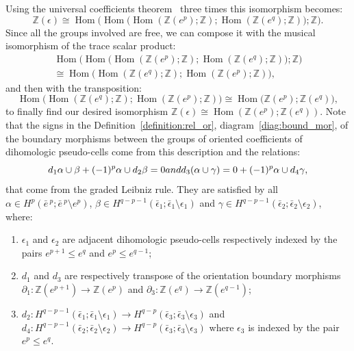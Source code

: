 \documentclass[10pt]{amsart}
\theoremstyle{definition}
\numberwithin{equation}{section}
\numberwithin{figure}{section}
\newcommand{\Z}{\mathbb{Z}}
\DeclareMathOperator{\Hom}{Hom}
\begin{document}
Using the universal coefficients theorem~\cite[Theorem~3.3 p.~113]{Car-Eil_hom_alg}
three times this isomorphism becomes:
\begin{equation*}
\Z(\epsilon) \cong \Hom\Big(\Hom\Big(\Hom(\Z(e^p);\Z);\Hom(\Z(e^q);\Z)\Big);\Z\Big).
\end{equation*}
Since all the groups involved are free, we can compose it with the musical isomorphism of the trace scalar product:
\begin{multline*}
\Hom\Big(\Hom\Big(\Hom(\Z(e^p);\Z);\Hom(\Z(e^q);\Z)\Big);\Z\Big)\\
\cong \Hom\Big(\Hom(\Z(e^q);\Z);\Hom(\Z(e^p);\Z)\Big),
\end{multline*}
and then with the transposition:
\begin{equation*}
\Hom\Big(\Hom(\Z(e^q);\Z);\Hom(\Z(e^p);\Z)\Big) \cong \Hom\Big(\Z(e^p);\Z(e^q)\Big),
\end{equation*}
to finally find our desired isomorphism $\Z(\epsilon)\cong\Hom(\Z(e^p);\Z(e^q))$. Note that the signs in the Definition~\ref{definition:rel_or}, diagram~\eqref{diag:bound_mor}, of the boundary morphisms between the groups of oriented coefficients of dihomologic pseudo-cells come from this description and the relations:
\begin{equation*}
d_1\alpha\cup\beta+(-1)^p\alpha\cup d_2\beta = 0 \textnormal{ and } d_3(\alpha\cup \gamma)=0+(-1)^p\alpha\cup d_4\gamma,
\end{equation*}
that come from the graded Leibniz rule. They are satisfied by all $\alpha\in H^p(\bar{e}\,^p;\bar{e}\,^p\setminus e^p)$, $\beta\in H^{q-p-1}(\bar{\epsilon}_1;\bar{\epsilon}_1\setminus\epsilon_1)$ and $\gamma\in H^{q-p-1}(\bar{\epsilon}_2;\bar{\epsilon}_2\setminus\epsilon_2)$, where:
\begin{enumerate}
\item $\epsilon_1$ and $\epsilon_2$ are adjacent dihomologic pseudo-cells respectively indexed by the pairs $e^{p+1}\leq e^q$ and $e^p\leq e^{q-1}$;
\item $d_1$ and $d_3$ are respectively transpose of the orientation boundary morphisms $\partial_1:\Z(e^{p+1})\rightarrow\Z(e^p)$ and ${\partial_3:\Z(e^{q})\rightarrow\Z(e^{q-1})}$;
\item $d_2:H^{q-p-1}(\bar{\epsilon}_1;\bar{\epsilon}_1\setminus\epsilon_1)\rightarrow H^{q-p}(\bar{\epsilon}_3;\bar{\epsilon}_3\setminus\epsilon_3)$ and $d_4:H^{q-p-1}(\bar{\epsilon}_2;\bar{\epsilon}_2\setminus\epsilon_2)\rightarrow H^{q-p}(\bar{\epsilon}_3;\bar{\epsilon}_3\setminus\epsilon_3)$ where $\epsilon_3$ is indexed by the pair $e^p\leq e^q$.
\end{enumerate}
\end{document}

